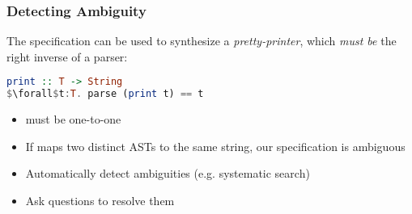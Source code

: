 \begin{frame}[fragile]
\frametitle{Detecting Ambiguity}

The specification can be used to synthesize a {\em pretty-printer},
which {\em must be} the right inverse of a parser:

\begin{lstlisting}[mathescape, language=haskell]
print :: T -> String
$\forall$t:T. parse (print t) == t
\end{lstlisting}

\begin{itemize}
\item{ must be one-to-one}
\item{If  maps two distinct ASTs to the same
    string, our specification is ambiguous}
\item{Automatically detect ambiguities (e.g. systematic search)}
\item{Ask questions to resolve them}
\end{itemize}
\end{frame}

